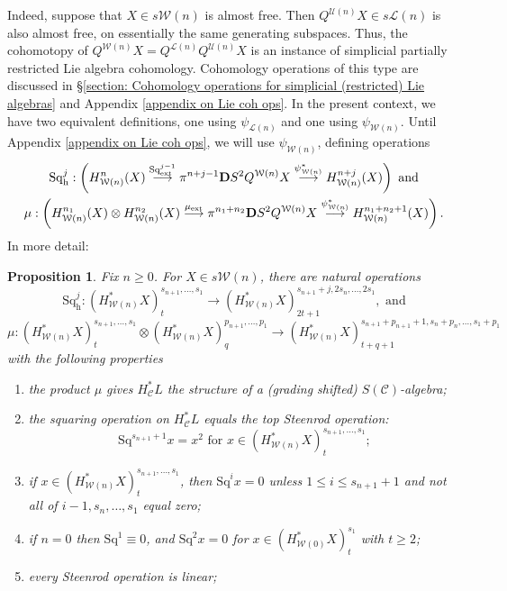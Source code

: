 \documentclass[11pt]{amsart} \renewcommand{\baselinestretch}{1.4}
\theoremstyle{plain}
\newtheorem{prop}[thm]{Proposition}
\theoremstyle{definition}
\renewcommand{\to}{\longrightarrow}
\newcommand{\scrC}{\mathscr{C}}
\newcommand{\calU}{\mathcal{U}}
\newcommand{\calL}{\mathcal{L}}
\newcommand{\calw}{\mathcal{W}}
\newcommand{\calc}{\mathcal{C}}
\newcommand{\CommOperad}{{\scrC}}
\newcommand{\ExtCohOp}{\mathrm{Sq}_\mathrm{ext}}
\newcommand{\ExtCohProd}{\mu_\mathrm{ext}}
\newcommand{\Sq}{\mathrm{Sq}}
\newcommand{\dhor}{_\mathrm{h}}
\newcommand{\Sqh}{\mathrm{Sq}\dhor}
\newcommand{\dual}{\mathbf{D}}
\begin{document}
\begin{Cohomology Operations for W and U}
Indeed, suppose that $X\in s\calw(n)$ is almost free. Then $Q^{\calU(n)}X\in s\calL(n)$ is also almost free, on essentially the same generating subspaces. Thus, the cohomotopy of $Q^{\calw(n)}X=Q^{\calL(n)}Q^{\calU(n)}X$ is an instance of simplicial partially restricted Lie algebra cohomology. Cohomology operations of this type are discussed in \S\ref{section: Cohomology operations for simplicial (restricted) Lie algebras} and Appendix \ref{appendix on Lie coh ops}. In the present context, we have two equivalent definitions, one using $\psi_{\calL(n)}$ and one using $\psi_{\calw(n)}$. Until Appendix \ref{appendix on Lie coh ops}, we will use $\psi_{\calw(n)}$, defining operations
\begin{gather*}
\Sqh^j:\left(H_{\calw(n)}^{n}(X)\overset{\ExtCohOp^{j-1}}{\to} \pi^{n+j-1}\dual S^2Q^{\calw(n)}X\overset{\psi_{\calw(n)}^*}{\to} H_{\calw(n)}^{n+j}(X)\right)\textup{ and}\\
\mu:\left(H_{\calw(n)}^{n_1}(X)\otimes H_{\calw(n)}^{n_2}(X)\overset{\ExtCohProd}{\to} \pi^{n_1+n_2}\dual S^2Q^{\calw(n)}X\overset{\psi_{\calw(n)}^*}{\to} H_{\calw(n)}^{n_1+n_2+1}(X)\right).
\end{gather*}
In more detail:
\begin{prop}
\label{Wn Halg omnibus}
Fix $n\geq0$. For $X\in s\calw(n)$, there are natural operations
\[\Sqh^j:(H^*_{\calw(n)}X)_t^{s_{n+1},\ldots,s_1}\to (H^*_{\calw(n)}X)_{2t+1}^{s_{n+1}+j,2s_{n},\ldots,2s_1},\text{ and}\]
\[\mu:(H^*_{\calw(n)}X)_t^{s_{n+1},\ldots,s_1}\otimes (H^*_{\calw(n)}X)_q^{p_{n+1},\ldots,p_1}\to (H^*_{\calw(n)}X)_{t+q+1}^{s_{n+1}+p_{n+1}+1,s_{n}+p_{n},\ldots,s_1+p_1}\]
with the following properties
\begin{enumerate}
\item the product $\mu$ gives $H^*_{\calc}L$ the structure of a (grading shifted) $S(\CommOperad)$-algebra;
\item the squaring operation on $H^*_{\calc}L$ equals the \emph{top Steenrod operation}:
\[\Sq^{s_{n+1}+1}x=x^{2}\text{\ \ for $x\in (H^*_{\calw(n)}X)_t^{s_{n+1},\ldots,s_1}$};\]
\item \label{Sq unstable vanishing II} if $x\in (H^*_{\calw(n)}X)_t^{s_{n+1},\ldots,s_1}$, then $\Sq^ix=0$ unless $1\leq i\leq s_{n+1}+1$ and not all of $i-1,s_{n},\ldots,s_1$ equal zero;
\item \label{Sq unstable vanishing III} if $n=0$ then $\Sq^1\equiv 0$, and $\Sq^2x=0$ for $x\in (H^*_{\calw(0)}X)_t^{s_1}$ with $t\geq 2$;
\item every Steenrod operation is linear;

\end{enumerate}
\end{prop}
\end{Cohomology Operations for W and U}
\end{document}
